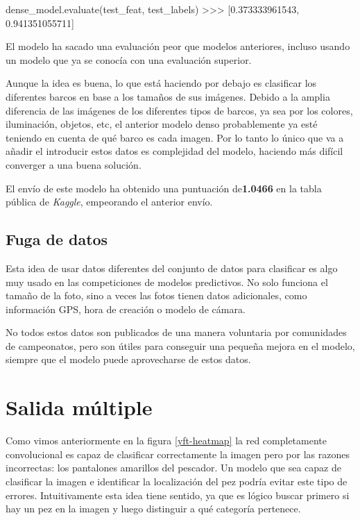 \begin{python}
dense_model.evaluate(test_feat, test_labels)
>>> [0.373333961543, 0.941351055711]
\end{python}

El modelo ha sacado una evaluación peor que modelos anteriores, incluso usando un modelo que ya se conocía con una evaluación superior.

Aunque la idea es buena, lo que está haciendo por debajo es clasificar los
diferentes barcos en base a los tamaños de sus imágenes. Debido a la amplia
diferencia de las imágenes de los diferentes tipos de barcos, ya sea por los
colores, iluminación, objetos, etc, el anterior modelo denso probablemente ya
esté teniendo en cuenta de qué barco es cada imagen. Por lo tanto lo único que
va a añadir el introducir estos datos es complejidad del modelo, haciendo más
difícil converger a una buena solución.

El envío de este modelo ha obtenido una puntuación de\textbf{1.0466} en la tabla pública de \textit{Kaggle}, empeorando el anterior envío.



\subsection{Fuga de datos}

Esta idea de usar datos diferentes del conjunto de datos para clasificar es algo muy usado en las competiciones de modelos predictivos. No solo funciona el tamaño de la foto, sino a veces las fotos tienen datos adicionales, como información GPS, hora de creación o modelo de cámara.

No todos estos datos son publicados de una manera voluntaria por comunidades de campeonatos, pero son útiles para conseguir una pequeña mejora en el modelo, siempre que el modelo puede aprovecharse de estos datos.

\section{Salida múltiple}

Como vimos anteriormente en la figura \ref{yft-heatmap} la red completamente
convolucional es capaz de clasificar correctamente la imagen pero por las
razones incorrectas: los pantalones amarillos del pescador. Un modelo que sea
capaz de clasificar la imagen e identificar la localización del pez podría
evitar este tipo de errores. Intuitivamente esta idea tiene sentido, ya que es lógico
buscar primero si hay un pez en la imagen y luego distinguir a qué categoría
pertenece.

